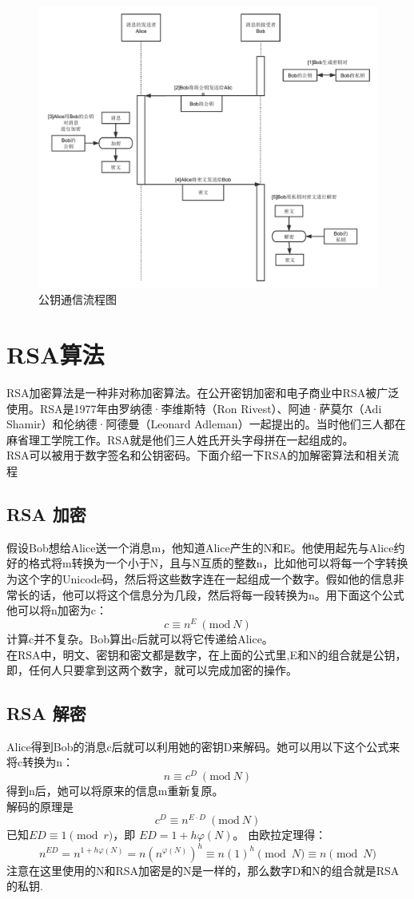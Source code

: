 \documentclass[UTF8,nofonts,cs4size]{ctexrep}
\begin{document}
\begin{figure}{}
\centering
\includegraphics[scale = 0.7]{ss.pdf}
\caption{公钥通信流程图}
\end{figure}

\chapter{RSA算法}
RSA加密算法是一种非对称加密算法。在公开密钥加密和电子商业中RSA被广泛使用。RSA是1977年由罗纳德·李维斯特（Ron Rivest）、阿迪·萨莫尔（Adi Shamir）和伦纳德·阿德曼（Leonard Adleman）一起提出的。当时他们三人都在麻省理工学院工作。RSA就是他们三人姓氏开头字母拼在一起组成的。\\
\indent RSA可以被用于数字签名和公钥密码。下面介绍一下RSA的加解密算法和相关流程
\section{RSA 加密}
假设Bob想给Alice送一个消息m，他知道Alice产生的N和E。他使用起先与Alice约好的格式将m转换为一个小于N，且与N互质的整数n，比如他可以将每一个字转换为这个字的Unicode码，然后将这些数字连在一起组成一个数字。假如他的信息非常长的话，他可以将这个信息分为几段，然后将每一段转换为n。用下面这个公式他可以将n加密为c：
$$ c \equiv n^E \ (\mathrm{mod}\ N) $$
\indent 计算c并不复杂。Bob算出c后就可以将它传递给Alice。\\
\indent 在RSA中，明文、密钥和密文都是数字，在上面的公式里,E和N的组合就是公钥，即，任何人只要拿到这两个数字，就可以完成加密的操作。
\section{RSA 解密}
Alice得到Bob的消息c后就可以利用她的密钥D来解码。她可以用以下这个公式来将c转换为n：
$$ n \equiv c^D \ (\mathrm{mod}\ N) $$
\indent 得到n后，她可以将原来的信息m重新复原。\\
\indent 解码的原理是
$$ c^D \equiv n^{E \cdot D}\ (\mathrm{mod}\ N)$$
\indent 已知$ED \equiv 1 \pmod{r}$，即 $ED=1+h\varphi (N)$。 由欧拉定理得：
$$n^{ED} = n^{1 + h\varphi(N)} = n \left(n^{\varphi(N)}\right)^{h} \equiv n (1)^{h} \pmod{N} \equiv n \pmod{N}$$ 
\indent 注意在这里使用的N和RSA加密是的N是一样的，那么数字D和N的组合就是RSA的私钥.
\end{document}
